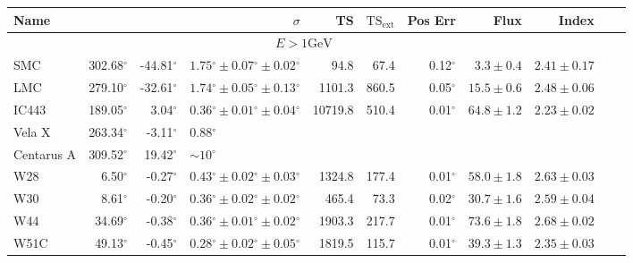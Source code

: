 \documentclass[12pt,preprint]{aastex}
\newcommand{\gev}{\text{GeV}\xspace}
\newcommand{\tsext}{{\ensuremath{\text{TS}_{\text{ext}}}}\xspace}
\newcommand{\glon}{\text{GLON}\xspace}
\newcommand{\glat}{\text{GLAT}\xspace}
\renewcommand{\deg}{\ensuremath{^\circ}\xspace}
\renewcommand{\approx}{\sim\!\xspace}
\begin{document}
\clearpage
\begin{table}
    \begin{centering}
      \begin{tabular}{l|rrlrrrrrrr}
        \hline
        \hline
        Name                 &          \glon &          \glat &                \multicolumn{1}{r}{$\sigma$} &         TS &   $\tsext$ &    Pos Err &                  Flux &                 Index  \\
        \hline
        \multicolumn{9}{c}{$E > 1 \gev$} \\
        \hline
        SMC                  &     302.68\deg &     -44.81\deg & $  1.75\deg \pm   0.07\deg \pm   0.02\deg $ &       94.8 &       67.4 &   0.12\deg & $    3.3 \pm     0.4$ & $   2.41 \pm    0.17$  \\
        LMC                  &     279.10\deg &     -32.61\deg & $  1.74\deg \pm   0.05\deg \pm   0.13\deg $ &     1101.3 &      860.5 &   0.05\deg & $   15.5 \pm     0.6$ & $   2.48 \pm    0.06$  \\
        IC443                &     189.05\deg &       3.04\deg & $  0.36\deg \pm   0.01\deg \pm   0.04\deg $ &    10719.8 &      510.4 &   0.01\deg & $   64.8 \pm     1.2$ & $   2.23 \pm    0.02$  \\
        Vela X               &     263.34\deg &      -3.11\deg & $                                 0.88\deg$ &            &            &            &                       &                       \\
        Centarus A           &     309.52\deg &      19.42\deg & $                            \approx10\deg$ &            &            &            &                       &                       \\
        W28                  &       6.50\deg &      -0.27\deg & $  0.43\deg \pm   0.02\deg \pm   0.03\deg $ &     1324.8 &      177.4 &   0.01\deg & $   58.0 \pm     1.8$ & $   2.63 \pm    0.03$  \\
        W30                  &       8.61\deg &      -0.20\deg & $  0.36\deg \pm   0.02\deg \pm   0.02\deg $ &      465.4 &       73.3 &   0.02\deg & $   30.7 \pm     1.6$ & $   2.59 \pm    0.04$  \\
        W44                  &      34.69\deg &      -0.38\deg & $  0.36\deg \pm   0.01\deg \pm   0.02\deg $ &     1903.3 &      217.7 &   0.01\deg & $   73.6 \pm     1.8$ & $   2.68 \pm    0.02$  \\
        W51C                 &      49.13\deg &      -0.45\deg & $  0.28\deg \pm   0.02\deg \pm   0.05\deg $ &     1819.5 &      115.7 &   0.01\deg & $   39.3 \pm     1.3$ & $   2.35 \pm    0.03$  \\

\end{tabular}
\end{centering}
\end{table}
\end{document}

